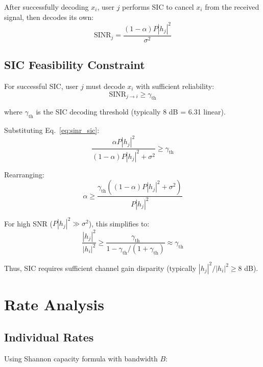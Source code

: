 After successfully decoding $x_i$, user $j$ performs SIC to cancel $x_i$ from the received signal, then decodes its own:
\begin{equation}
\text{SINR}_j = \frac{(1-\alpha) P |h_j|^2}{\sigma^2}
\label{eq:sinr_strong}
\end{equation}

\subsection{SIC Feasibility Constraint}

For successful SIC, user $j$ must decode $x_i$ with sufficient reliability:
\begin{equation}
\text{SINR}_{j \to i} \geq \gamma_{\text{th}}
\label{eq:sic_constraint}
\end{equation}

where $\gamma_{\text{th}}$ is the SIC decoding threshold (typically 8 dB = 6.31 linear).

Substituting Eq.~\eqref{eq:sinr_sic}:
\begin{equation}
\frac{\alpha P |h_j|^2}{(1-\alpha) P |h_j|^2 + \sigma^2} \geq \gamma_{\text{th}}
\end{equation}

Rearranging:
\begin{equation}
\alpha \geq \frac{\gamma_{\text{th}} \left((1-\alpha) P |h_j|^2 + \sigma^2\right)}{P |h_j|^2}
\end{equation}

For high SNR ($P |h_j|^2 \gg \sigma^2$), this simplifies to:
\begin{equation}
\frac{|h_j|^2}{|h_i|^2} \geq \frac{\gamma_{\text{th}}}{1 - \gamma_{\text{th}}/(1 + \gamma_{\text{th}})} \approx \gamma_{\text{th}}
\label{eq:channel_disparity}
\end{equation}

Thus, SIC requires sufficient channel gain disparity (typically $|h_j|^2 / |h_i|^2 \geq 8$ dB).

\section{Rate Analysis}

\subsection{Individual Rates}

Using Shannon capacity formula with bandwidth $B$:

